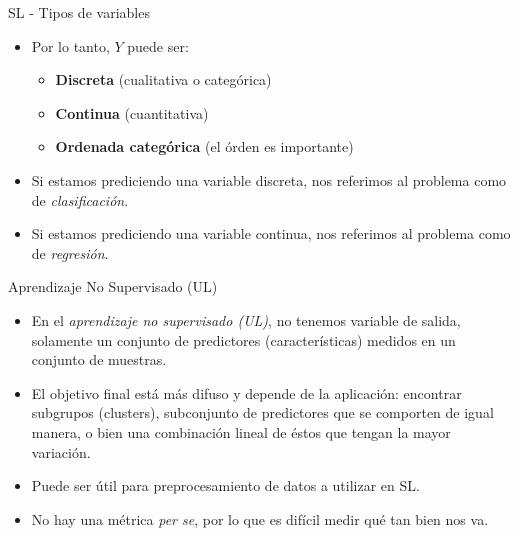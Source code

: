 \documentclass[usenames,dvipsnames]{beamer} %
\newcommand\defi[1]{\textcolor{NavyBlue}{\textit{#1}}}
\begin{document}
\begin{frame}{SL - Tipos de variables}
\begin{itemize}
    \item Por lo tanto, $Y$ puede ser:
    \begin{itemize}
        \item \textbf{Discreta} (cualitativa o categ\'orica)
        \item \textbf{Continua} (cuantitativa)
        \item \textbf{Ordenada categ\'orica} (el \'orden es importante)
    \end{itemize}
    \item Si estamos prediciendo una variable discreta, nos referimos al problema como de \defi{clasificaci\'on}.
    \item Si estamos prediciendo una variable continua, nos referimos al problema como de \defi{regresi\'on}.
\end{itemize}
\end{frame}

\begin{frame}{Aprendizaje No Supervisado (UL)}
    \begin{itemize}
        \item En el \defi{aprendizaje no supervisado (UL)}, no tenemos variable de salida, solamente un conjunto de predictores (caracter\'isticas) medidos en un conjunto de muestras.
        \item El objetivo final est\'a m\'as difuso y depende de la aplicaci\'on: encontrar subgrupos (clusters), subconjunto de predictores que se comporten de igual manera, o bien una combinaci\'on lineal de \'estos que tengan la mayor variaci\'on.
        \item Puede ser \'util para preprocesamiento de datos a utilizar en SL.
        \item No hay una m\'etrica \textit{per se}, por lo que es dif\'icil medir qu\'e tan bien nos va.
    \end{itemize}
\end{frame}
\end{document}

